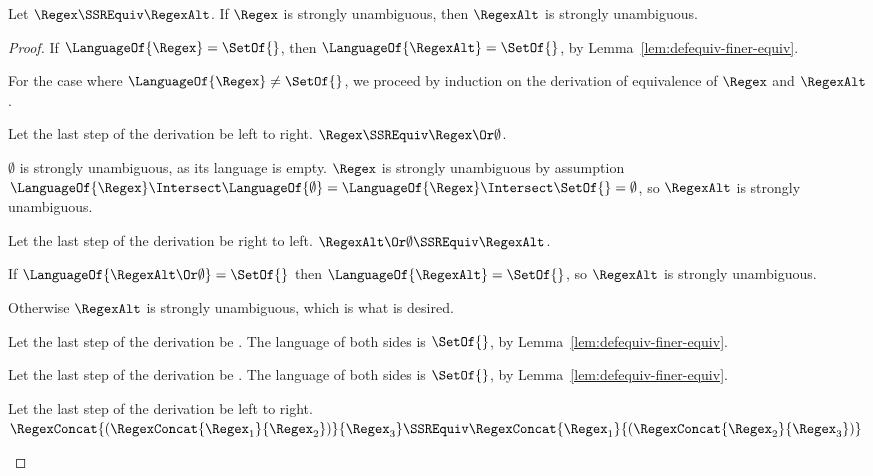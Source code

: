 \documentclass[acmsmall,screen]{acmart}
\begin{document}
\begin{mylemma}
  Let $\Regex \SSREquiv \RegexAlt$.
  If $\Regex$ is strongly unambiguous, then $\RegexAlt$ is strongly unambiguous.
\end{mylemma}
\begin{proof}
  If $\LanguageOf{\Regex} = \SetOf{}$, then $\LanguageOf{\RegexAlt} = \SetOf{}$,
  by Lemma~\ref{lem:defequiv-finer-equiv}.

  For the case where $\LanguageOf{\Regex} \neq \SetOf{}$, we proceed by
  induction on the derivation of equivalence of $\Regex$ and $\RegexAlt$.
  \begin{case}
    Let the last step of the derivation be \OrIdentityRule{} left to right.
    $\Regex \SSREquiv \Regex \Or \emptyset$.

    $\emptyset$ is strongly unambiguous, as its language is empty.
    $\Regex$ is strongly unambiguous by assumption
    $\LanguageOf{\Regex} \Intersect \LanguageOf{\emptyset} =
    \LanguageOf{\Regex} \Intersect \SetOf{} = \emptyset$, so $\RegexAlt$ is
    strongly unambiguous.
  \end{case}

  \begin{case}
    Let the last step of the derivation be \OrIdentityRule{} right to left.
    $\RegexAlt \Or \emptyset \SSREquiv \RegexAlt$.

    If $\LanguageOf{\RegexAlt \Or \emptyset} = \SetOf{}$ then
    $\LanguageOf{\RegexAlt} = \SetOf{}$, so $\RegexAlt$ is strongly unambiguous.

    Otherwise $\RegexAlt$ is strongly unambiguous, which is what is desired.
  \end{case}

  \begin{case}
    Let the last step of the derivation be \EmptyProjectionRightRule{}.
    The language of both sides is $\SetOf{}$, by
    Lemma~\ref{lem:defequiv-finer-equiv}.
  \end{case}

  \begin{case}
    Let the last step of the derivation be \EmptyProjectionLeftRule{}.
    The language of both sides is $\SetOf{}$, by
    Lemma~\ref{lem:defequiv-finer-equiv}.
  \end{case}
  
  \begin{case}
    Let the last step of the derivation be \ConcatAssocRule{} left to right.
    $\RegexConcat{(\RegexConcat{\Regex_1}{\Regex_2})}{\Regex_3}
    \SSREquiv
    \RegexConcat{\Regex_1}{(\RegexConcat{\Regex_2}{\Regex_3})}$


\end{case}
\end{proof}
\end{document}
